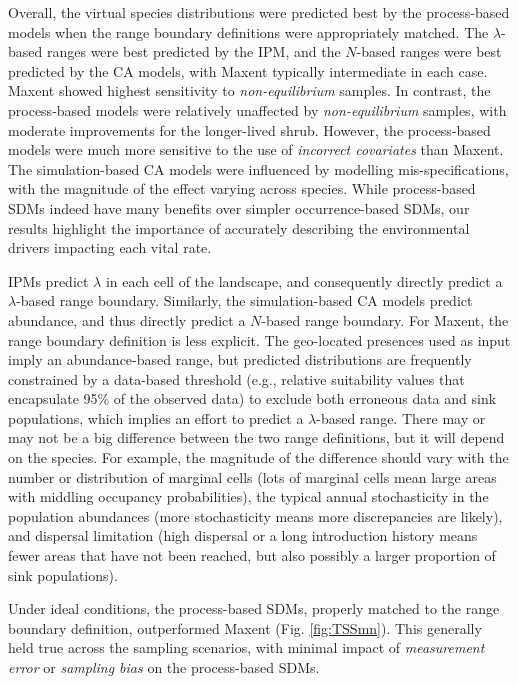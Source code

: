 \documentclass[preprint,review,times,12pt]{elsarticle}
\begin{document}
Overall, the virtual species distributions were predicted best by the process-based models when the range boundary definitions were appropriately matched. The $\lambda$-based ranges were best predicted by the IPM, and the $N$-based ranges were best predicted by the CA models, with Maxent typically intermediate in each case. Maxent showed highest sensitivity to \emph{non-equilibrium} samples. In contrast, the process-based models were relatively unaffected by \emph{non-equilibrium} samples, with moderate improvements for the longer-lived shrub. However, the process-based models were much more sensitive to the use of \emph{incorrect covariates} than Maxent. The simulation-based CA models were influenced by modelling mis-specifications, with the magnitude of the effect varying across species. While process-based SDMs indeed have many benefits over simpler occurrence-based SDMs, our results highlight the importance of accurately describing the environmental drivers impacting each vital rate. 

IPMs predict $\lambda$ in each cell of the landscape, and consequently directly predict a $\lambda$-based range boundary. Similarly, the simulation-based CA models predict abundance, and thus directly predict a $N$-based range boundary. For Maxent, the range boundary definition is less explicit. The geo-located presences used as input imply an abundance-based range, but predicted distributions are frequently constrained by a data-based threshold (e.g., relative suitability values that encapsulate 95\% of the observed data) to exclude both erroneous data and sink populations, which implies an effort to predict a $\lambda$-based range. There may or may not be a big difference between the two range definitions, but it will depend on the species. For example, the magnitude of the difference should vary with the number or distribution of marginal cells (lots of marginal cells mean large areas with middling occupancy probabilities), the typical annual stochasticity in the population abundances (more stochasticity means more discrepancies are likely), and dispersal limitation (high dispersal or a long introduction history means fewer areas that have not been reached, but also possibly a larger proportion of sink populations). 

Under ideal conditions, the process-based SDMs, properly matched to the range boundary definition, outperformed Maxent (Fig. \ref{fig:TSSmn}). This generally held true across the sampling scenarios, with minimal impact of \emph{measurement error} or \emph{sampling bias} on the process-based SDMs. 
\end{document}
